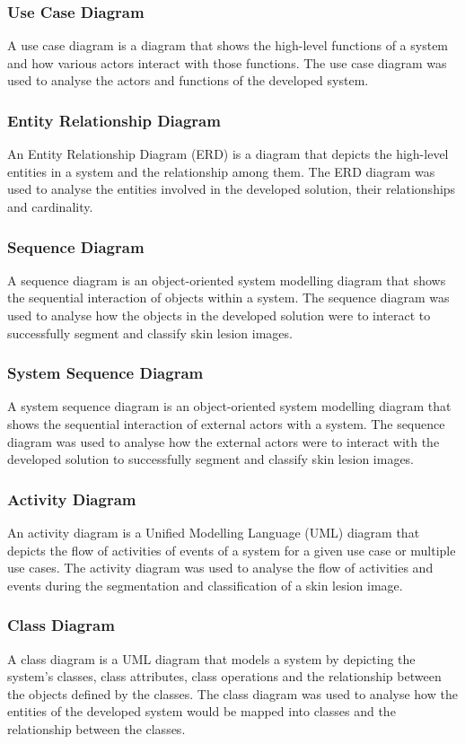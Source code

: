 \documentclass[12pt, a4paper]{article}
\begin{document}
\subsubsection{Use Case Diagram}
A use case diagram is a diagram that shows the high-level functions of a system and how various actors interact with those functions. The use case diagram was used to analyse the actors and functions of the developed system.
\subsubsection{Entity Relationship Diagram}
An Entity Relationship Diagram (ERD) is a diagram that depicts the high-level entities in a system and the relationship among them. The ERD diagram was used to analyse the entities involved in the developed solution, their relationships and cardinality.
\subsubsection{Sequence Diagram}
A sequence diagram is an object-oriented system modelling diagram that shows the sequential interaction of objects within a system. The sequence diagram was used to analyse how the objects in the developed solution were to interact to successfully segment and classify skin
lesion images.
\subsubsection{System Sequence Diagram}
A system sequence diagram is an object-oriented system modelling diagram that shows the sequential interaction of external actors with a system. The sequence diagram was used to analyse how the external actors were to interact with the developed solution to successfully segment and classify skin lesion images.
\subsubsection{Activity Diagram}
An activity diagram is a Unified Modelling Language (UML) diagram that depicts the flow of activities of events of a system for a given use case or multiple use cases. The activity diagram was used to analyse the flow of activities and events during the segmentation and classification of a skin lesion image.
\subsubsection{Class Diagram}
A class diagram is a UML diagram that models a system by depicting the system's classes, class attributes, class operations and the relationship between the objects defined by the classes. The class diagram was used to analyse how the entities of the developed system would be mapped into classes and the relationship between the classes.
\end{document}
